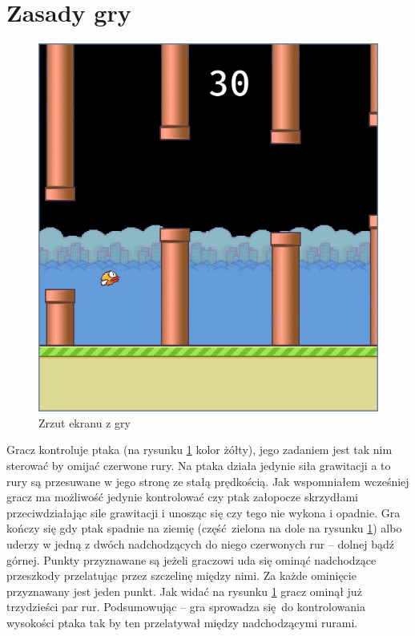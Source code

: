 \documentclass[a4paper,12pt,oneside]{book}
\begin{document}
\section{Zasady gry}
\begin{figure}[h]
	\begin{center}
		\includegraphics[scale=0.40]{flappy_bird.png}
		\caption{Zrzut ekranu z gry}
		\label{flappy_screenshot}
	\end{center}
\end{figure}

Gracz kontroluje ptaka (na rysunku \ref{flappy_screenshot} kolor żółty),
jego zadaniem jest tak nim sterować by omijać czerwone rury.
Na ptaka działa jedynie siła grawitacji a to rury są przesuwane w jego stronę ze
stałą prędkością. Jak wspomniałem wcześniej gracz ma możliwość jedynie kontrolować
czy ptak załopocze skrzydłami przeciwdziałając sile grawitacji i unosząc się czy
tego nie wykona i opadnie. Gra kończy się gdy ptak spadnie na ziemię 
(część zielona na dole na rysunku \ref{flappy_screenshot}) albo uderzy
w jedną z dwóch nadchodzących do niego czerwonych rur -- dolnej bądź górnej. Punkty
przyznawane są jeżeli graczowi uda się ominąć nadchodzące przeszkody przelatując
przez szczelinę między nimi. Za każde ominięcie przyznawany jest jeden punkt. Jak
widać na rysunku \ref{flappy_screenshot} gracz ominął już trzydzieści par rur.
Podsumowując -- gra sprowadza się do kontrolowania wysokości ptaka tak by ten
przelatywał między nadchodzącymi rurami.
\end{document}
